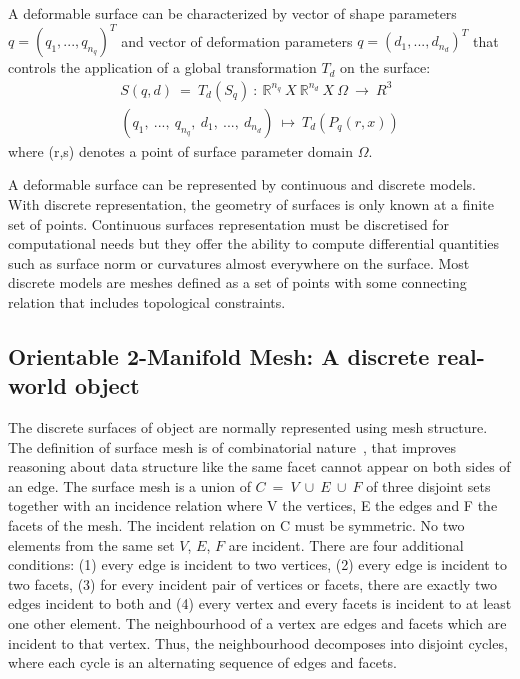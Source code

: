 \documentclass{InsightArticle}
\begin{document}
A deformable surface can be characterized by vector of shape parameters $q = ( q_1, ... , q_{n_q})^T$ and vector of deformation parameters $q = ( d_1, ... , d_{n_d})^T$ that controls the application of a global transformation $T_d$ 
on the surface:
\begin{equation}
\begin{split}
	S(q,d)~=~T_d(S_q) ~:~\mathbb{R}^{n_q}~X~\mathbb{R}^{n_d}~X~\Omega~\longrightarrow~R^3 \\	
	(q_1,~... ,~q_{n_q},~d_1,~... ,~d_{n_d} )~\longmapsto~T_d(P_q(r,x))	\end{split}
\end{equation}
where (r,s) denotes a point of surface parameter domain $\Omega$.

A deformable surface can be represented by continuous and discrete models. With discrete representation, the geometry of surfaces is only known at a finite set of points. Continuous surfaces representation must be discretised for computational needs but they offer the ability to compute differential quantities such as surface norm or curvatures almost everywhere on the surface. Most discrete models are meshes defined as a set of points with some connecting relation that includes topological constraints. 
\subsection{Orientable 2-Manifold Mesh: A discrete real-world object}
The discrete surfaces of object are normally represented using mesh structure. The definition of surface mesh is of combinatorial nature~\cite{Kettner1999}, that improves reasoning about data structure like the same facet cannot appear on both sides of an edge. The surface mesh is a union of $C~=~V~\cup~E~\cup~F$ of three disjoint sets together with an incidence relation where V the vertices, E the edges and F the facets of the mesh. The incident relation on C must be symmetric. No two elements from the same set $V$, $E$, $F$ are incident. There are four additional conditions: (1) every edge is incident to two vertices, (2) every edge is incident to two facets, (3) for every incident pair of vertices or facets, there are exactly two edges incident to both and (4) every vertex and every facets is incident to at least one other element. The neighbourhood of a vertex are edges and facets which are incident to that vertex. Thus, the neighbourhood decomposes into disjoint cycles, where each cycle is an alternating sequence of edges and facets.
\end{document}
